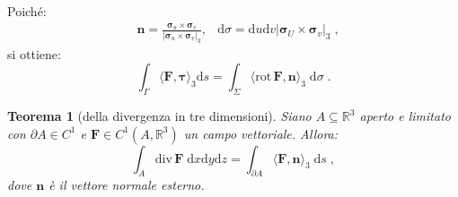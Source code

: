 \documentclass[a4paper,12pt]{report}
\theoremstyle{plain}
\newtheorem{thm}{Teorema}[section]
\theoremstyle{definition}
\theoremstyle{remark}
\newcommand{\Div}{\mathrm{div}\,}
\newcommand{\Rot}{\mathrm{rot}\,}
\newcommand{\BF}[1]{\boldsymbol{#1}}
\newcommand{\diff}[1]{\mathrm{d}#1}
\numberwithin{equation}{section}
\begin{document}
Poiché:
\begin{align}
&\mathbf{n}=\frac{\BF{\sigma}_u\times\BF{\sigma}_v}{|\BF{\sigma}_u\times\BF{\sigma}_v|_3}, &\diff{\sigma}=\diff{u}\diff{v}|\BF{\sigma}_U\times\BF{\sigma}_v|_3\;,
\end{align}
si ottiene:
\begin{equation}
\int_{\Gamma}\langle\mathbf{F},\BF{\tau}\rangle_3\diff{s}=\int_{\Sigma} \langle \Rot \mathbf{F},\mathbf{n}\rangle_3\;\diff{\sigma}\;.
\end{equation}
\endproof
\begin{thm}[della divergenza in tre dimensioni] Siano $A\subseteq\mathbb{R}^3$ aperto e limitato con $\partial A\in C^1$ e $\mathbf{F}\in C^1(A,\mathbb{R}^3)$ un campo vettoriale. Allora:
\begin{equation}
\int_A \Div \mathbf{F}\;\diff{x}\diff{y}\diff{z}=\int_{\partial A} \langle \mathbf{F},\mathbf{n}\rangle_3\;\diff{s}\;,
\end{equation}
dove $\mathbf{n}$ è il vettore normale esterno.
\end{thm}
\end{document}
